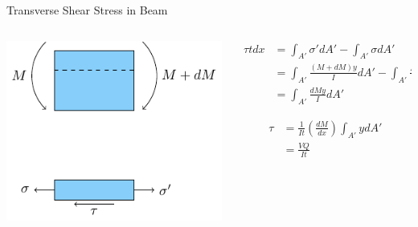 \documentclass[10pt, svgnames]{beamer}
\begin{document}
\begin{frame}[label={sec:org3c3cb08}]{Transverse Shear Stress in Beam}
\begin{columns}
\begin{column}{0.5\columnwidth}
\begin{center}
\includegraphics[width=.9\linewidth]{pictures/shear-in-beam.pdf}
\end{center}
\end{column}

\begin{column}{0.5\columnwidth}
\begin{align*}
  \tau t dx &= \int_{A'} \sigma' dA' - \int_{A'} \sigma dA' \\
            &= \int_{A'} \frac{ (M + dM)y }{I} dA' - \int_{A'} \frac{My}{I} dA' \\
            &= \int_{A'} \frac{dMy}{I} dA'
\end{align*}

\begin{align*}
  \tau &= \frac{1}{It} \left( \frac{dM}{dx} \right) \int_{A'} y dA' \\
       &= \frac{VQ}{It}
\end{align*}
\end{column}
\end{columns}
\end{frame}
\end{document}
